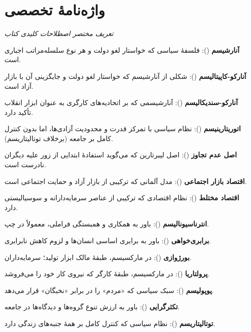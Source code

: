 \chapter*{واژه‌نامهٔ تخصصی}

\begin{center}
\textit{تعریف مختصر اصطلاحات کلیدی کتاب}
\end{center}

\vspace{5mm}



\textbf{آنارشیسم} (): فلسفهٔ سیاسی که خواستار لغو دولت و هر نوع سلسله‌مراتب اجباری است.

\textbf{آنارکو-کاپیتالیسم} (): شکلی از آنارشیسم که خواستار لغو دولت و جایگزینی آن با بازار آزاد است.

\textbf{آنارکو-سندیکالیسم} (): آنارشیسمی که بر اتحادیه‌های کارگری به عنوان ابزار انقلاب تأکید دارد.

\textbf{اتوریتارینیسم} (): نظام سیاسی با تمرکز قدرت و محدودیت آزادی‌ها، اما بدون کنترل کامل بر جامعه (برخلاف توتالیتاریسم).

\textbf{اصل عدم تجاوز} (): اصل لیبرتارین که می‌گوید استفادهٔ ابتدایی از زور علیه دیگران نادرست است.

\textbf{اقتصاد بازار اجتماعی} (): مدل آلمانی که ترکیبی از بازار آزاد و حمایت اجتماعی است.

\textbf{اقتصاد مختلط} (): نظام اقتصادی که ترکیبی از عناصر سرمایه‌دارانه و سوسیالیستی دارد.

\textbf{انترناسیونالیسم} (): باور به همکاری و همبستگی فراملی، معمولاً در چپ.

\textbf{برابری‌خواهی} (): باور به برابری اساسی انسان‌ها و لزوم کاهش نابرابری.

\textbf{بورژوازی} (): در مارکسیسم، طبقهٔ مالک ابزار تولید؛ سرمایه‌داران.

\textbf{پرولتاریا} (): در مارکسیسم، طبقهٔ کارگر که نیروی کار خود را می‌فروشد.

\textbf{پوپولیسم} (): سبک سیاسی که «مردم» را در برابر «نخبگان» قرار می‌دهد.

\textbf{تکثرگرایی} (): باور به ارزش تنوع گروه‌ها و دیدگاه‌ها در جامعه.

\textbf{توتالیتاریسم} (): نظام سیاسی که کنترل کامل بر همهٔ جنبه‌های زندگی دارد.

